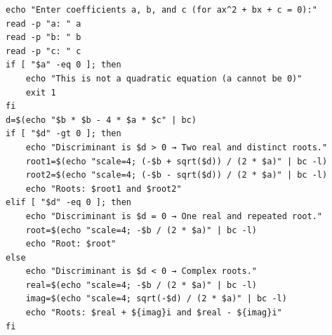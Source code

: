 \begin{verbatim}
echo "Enter coefficients a, b, and c (for ax^2 + bx + c = 0):"
read -p "a: " a
read -p "b: " b
read -p "c: " c
if [ "$a" -eq 0 ]; then
    echo "This is not a quadratic equation (a cannot be 0)"
    exit 1
fi
d=$(echo "$b * $b - 4 * $a * $c" | bc)
if [ "$d" -gt 0 ]; then
    echo "Discriminant is $d > 0 → Two real and distinct roots."
    root1=$(echo "scale=4; (-$b + sqrt($d)) / (2 * $a)" | bc -l)
    root2=$(echo "scale=4; (-$b - sqrt($d)) / (2 * $a)" | bc -l)
    echo "Roots: $root1 and $root2"
elif [ "$d" -eq 0 ]; then
    echo "Discriminant is $d = 0 → One real and repeated root."
    root=$(echo "scale=4; -$b / (2 * $a)" | bc -l)
    echo "Root: $root"
else
    echo "Discriminant is $d < 0 → Complex roots."
    real=$(echo "scale=4; -$b / (2 * $a)" | bc -l)
    imag=$(echo "scale=4; sqrt(-$d) / (2 * $a)" | bc -l)
    echo "Roots: $real + ${imag}i and $real - ${imag}i"
fi
\end{verbatim}